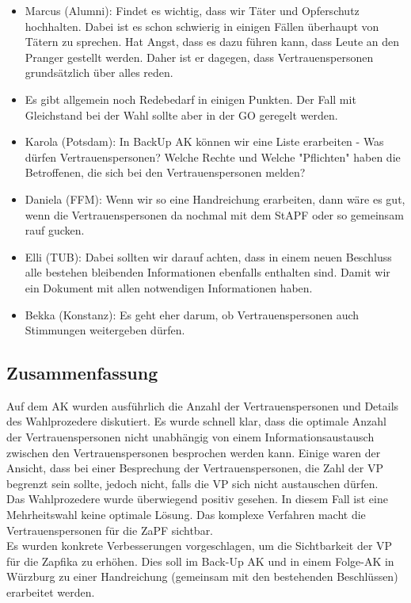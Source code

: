 \begin{itemize}
        \item Marcus (Alumni): Findet es wichtig, dass wir Täter und Opferschutz hochhalten. Dabei ist es schon schwierig in einigen Fällen überhaupt von Tätern zu sprechen. Hat Angst, dass es dazu führen kann, dass Leute an den Pranger gestellt werden. Daher ist er dagegen, dass Vertrauenspersonen grundsätzlich über alles reden.
        \item Es gibt allgemein noch Redebedarf in einigen Punkten. Der Fall mit Gleichstand bei der Wahl sollte aber in der GO geregelt werden.
        \item Karola (Potsdam): In BackUp AK können wir eine Liste erarbeiten - Was dürfen Vertrauenspersonen? Welche Rechte und Welche "Pflichten" haben die Betroffenen, die sich bei den Vertrauenspersonen melden?
        \item Daniela (FFM): Wenn wir so eine Handreichung erarbeiten, dann wäre es gut, wenn die Vertrauenspersonen da nochmal mit dem StAPF oder so gemeinsam rauf gucken.
        \item Elli (TUB): Dabei sollten wir darauf achten, dass in einem neuen Beschluss alle bestehen bleibenden Informationen ebenfalls enthalten sind. Damit wir ein Dokument mit allen notwendigen Informationen haben.
        \item Bekka (Konstanz): Es geht eher darum, ob Vertrauenspersonen auch Stimmungen weitergeben dürfen.
      \end{itemize}

  \subsection*{Zusammenfassung}
    Auf dem AK wurden ausführlich die Anzahl der Vertrauenspersonen und Details des Wahlprozedere diskutiert. Es wurde schnell klar, dass die optimale Anzahl der Vertrauenspersonen nicht unabhängig von einem Informationsaustausch zwischen den Vertrauenspersonen besprochen werden kann. Einige waren der Ansicht, dass bei einer Besprechung der Vertrauenspersonen, die Zahl der VP begrenzt sein sollte, jedoch nicht, falls die VP sich nicht austauschen dürfen. \\
    Das Wahlprozedere wurde überwiegend positiv gesehen. In diesem Fall ist eine Mehrheitswahl keine optimale Lösung. Das komplexe Verfahren macht die Vertrauenspersonen für die ZaPF sichtbar. \\
    Es wurden konkrete Verbesserungen vorgeschlagen, um die Sichtbarkeit der VP für die Zapfika zu erhöhen. Dies soll im Back-Up AK und in einem Folge-AK in Würzburg zu einer Handreichung (gemeinsam mit den bestehenden Beschlüssen) erarbeitet werden.
